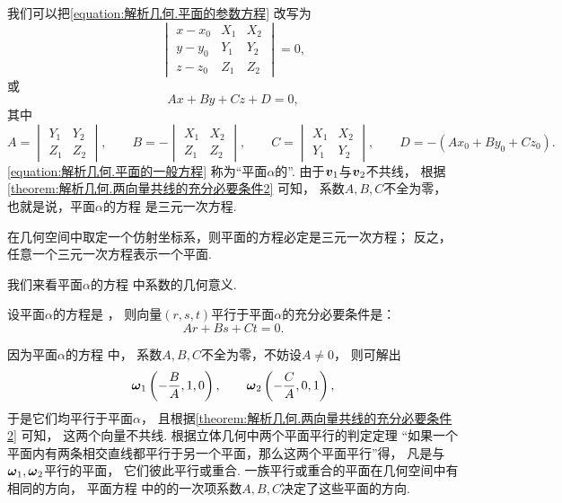 我们可以把\cref{equation:解析几何.平面的参数方程} 改写为
\begin{equation}
	\begin{vmatrix}
		x - x_0 & X_1 & X_2 \\
		y - y_0 & Y_1 & Y_2 \\
		z - z_0 & Z_1 & Z_2
	\end{vmatrix} = 0,
\end{equation}
或\begin{equation}\label{equation:解析几何.平面的一般方程}
	A x + B y + C z + D = 0,
\end{equation}
其中\[
	A = \begin{vmatrix}
		Y_1 & Y_2 \\
		Z_1 & Z_2
	\end{vmatrix},
	\qquad
	B = -\begin{vmatrix}
		X_1 & X_2 \\
		Z_1 & Z_2
	\end{vmatrix},
	\qquad
	C = \begin{vmatrix}
		X_1 & X_2 \\
		Y_1 & Y_2
	\end{vmatrix},
	\qquad
	D = - (A x_0 + B y_0 + C z_0).
\]
\cref{equation:解析几何.平面的一般方程}
称为“平面\(\alpha\)的”.
由于\(\boldsymbol{v}_1\)与\(\boldsymbol{v}_2\)不共线，
根据\cref{theorem:解析几何.两向量共线的充分必要条件2} 可知，
系数\(A,B,C\)不全为零，
也就是说，平面\(\alpha\)的方程  是三元一次方程.

\begin{theorem}
在几何空间中取定一个仿射坐标系，则平面的方程必定是三元一次方程；
反之，任意一个三元一次方程表示一个平面.
\end{theorem}

我们来看平面\(\alpha\)的方程  中系数的几何意义.

\begin{theorem}
设平面\(\alpha\)的方程是 ，
则向量\((r,s,t)\)平行于平面\(\alpha\)的充分必要条件是：\[
	Ar+Bs+Ct = 0.
\]
\end{theorem}

因为平面\(\alpha\)的方程  中，
系数\(A,B,C\)不全为零，不妨设\(A\neq0\)，
则可解出\[
	\boldsymbol{\omega}_1 \left( -\frac{B}{A},1,0 \right), \qquad
	\boldsymbol{\omega}_2 \left( -\frac{C}{A},0,1 \right),
\]
于是它们均平行于平面\(\alpha\)，
且根据\cref{theorem:解析几何.两向量共线的充分必要条件2} 可知，
这两个向量不共线.
根据立体几何中两个平面平行的判定定理
“如果一个平面内有两条相交直线都平行于另一个平面，那么这两个平面平行”得，
凡是与\(\boldsymbol{\omega}_1,\boldsymbol{\omega}_2\)平行的平面，
它们彼此平行或重合.
一族平行或重合的平面在几何空间中有相同的方向，
平面方程  中的的一次项系数\(A,B,C\)决定了这些平面的方向.

